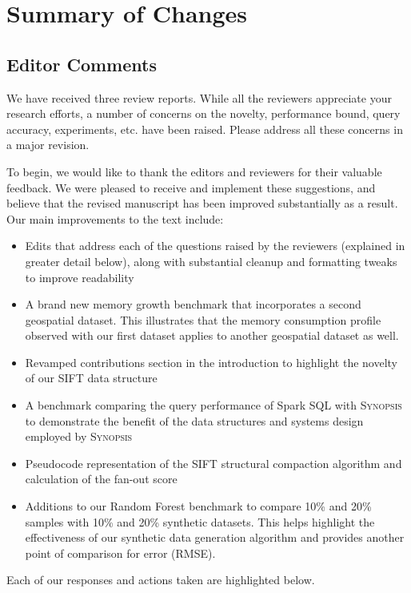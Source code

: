\documentclass{article}
\begin{document}
\section*{Summary of Changes}\label{summary-of-changes}
\subsection*{Editor Comments}\label{editor-comments}

We have received three review reports. While all the reviewers
appreciate your research efforts, a number of concerns on the novelty,
performance bound, query accuracy, experiments, etc. have been raised.
Please address all these concerns in a major revision.

\begin{tcolorbox}
To begin, we would like to thank the editors and reviewers for their
valuable feedback. We were pleased to receive and implement these
suggestions, and believe that the revised manuscript has been improved
substantially as a result. Our main improvements to the text include:

\begin{itemize}
\item Edits that address each of the questions raised by the reviewers (explained in greater detail below), along with substantial cleanup and formatting tweaks to improve readability

\item A brand new memory growth benchmark that incorporates a second geospatial dataset. This illustrates that the memory consumption profile observed with our first dataset applies to another geospatial dataset as well.

\item Revamped contributions section in the introduction to highlight the novelty of our SIFT data structure

\item A benchmark comparing the query performance of Spark SQL with \textsc{Synopsis} to demonstrate the benefit of the data structures and systems design employed by \textsc{Synopsis}

\item Pseudocode representation of the SIFT structural compaction algorithm and calculation of the fan-out score

\item Additions to our Random Forest benchmark to compare 10\% and 20\% samples with 10\% and 20\% synthetic datasets. This helps highlight the effectiveness of our synthetic data generation algorithm and provides another point of comparison for error (RMSE).
\end{itemize}
%
Each of our responses and actions taken are highlighted below.
\end{tcolorbox}
\end{document}
